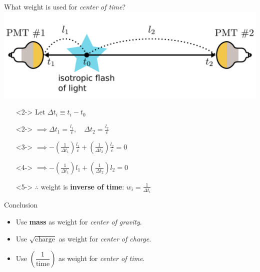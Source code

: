 \documentclass[14pt]{beamer}
\begin{document}
\begin{frame}{What weight is used for \emph{\color{blue}center of time}?}
	\includegraphics[width=\linewidth]{simple_example_of_center_of_time.pdf}
	\begin{itemize}
		\item[]<2-> Let $\Delta t_i \equiv t_i - t_0$
		\item[]<2-> $\implies \Delta t_1 = \frac{l_1}{c},\quad\Delta t_2 =
			\frac{l_2}{c}$
		\item[]<3-> $\implies -(\frac{1}{\Delta t_1})\frac{l_1}{c} +
			(\frac{1}{\Delta t_2})\frac{l_2}{c} = 0$
		\item[]<4-> $\implies -(\frac{1}{\Delta t_1})l_1 +
			(\frac{1}{\Delta t_2})l_2 = 0$
		\item[]<5-> $\therefore$ weight is \textbf{inverse of time}: $w_{i} =
			\frac{1}{\Delta t_{i}}$
	\end{itemize}
\end{frame}

\begin{frame}{Conclusion}
	\begin{itemize}
		\item<1-> Use \textbf{mass} as weight for \emph{center of gravity}.
		\item<2-> Use \textbf{$\sqrt{\text{charge}}$} as weight for
			\emph{\color{magenta}center of charge}.
		\item<3-> Use \textbf{$\left(\dfrac{1}{\text{time}}\right)$} as weight
			for \emph{\color{blue}center of time}.
	\end{itemize}
\end{frame}
\end{document}
